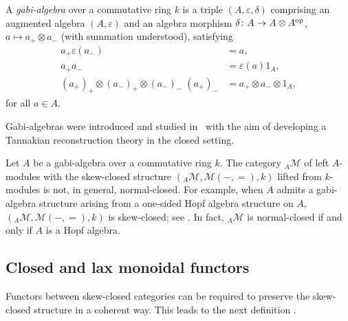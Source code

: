 \documentclass[12pt,dvipsnames,oneside]{amsart}
\theoremstyle{plain}
\theoremstyle{remark}
\theoremstyle{definition}
\newcommand*{\from}{\colon}
\newcommand*{\blank}{{-}}
\newcommand*{\bblank}{{=}}
\newcommand{\op}{^{\textup{op}}}
\newcommand{\cM}{\mathcal{M}}
\begin{document}
\begin{definition}\label{def:gabi-algebra}
  A \emph{gabi-algebra} over a commutative ring \(k\) is a triple \((A, \varepsilon, \delta)\) comprising an augmented algebra \((A, \varepsilon)\) and an algebra morphism \(\delta \from A \to A \otimes A\op\), \(a \mapsto a_{+} \otimes a_{-}\) (with summation understood), satisfying
  \begin{align}
    a_+ \varepsilon(a_{-}) &= a  \tag{GA1}\label{eq:GA1},\\
    a_{+}a_{-} & = \varepsilon(a) 1_{A} \tag{GA2}\label{eq:GA2},\\
    (a_{+})_{+} \otimes (a_{-})_{+} \otimes (a_{-})_{-} \; (a_{+})_{-} &= a_{+} \otimes a_{-} \otimes 1_{A}, \tag{GA3}\label{eq:GA3}
  \end{align}
  for all \(a \in A\).
\end{definition}

Gabi-algebras were introduced and studied in~\cite{Berger-Vercruysse-Saracco} with the aim of developing a Tannakian reconstruction theory in the closed setting.

\begin{example}\label{ex:gabi-algebra}
  Let \(A\) be a gabi-algebra over a commutative ring \(k\).
  The category \({}_A\cM\) of left \(A\)-modules with the skew-closed structure  \(\left({}_A\cM,\cM(\blank,\bblank),k\right)\) lifted from \(k\)-modules is not, in general, normal-closed.
  For example, when \(A\) admits a gabi-algebra structure arising from a one-sided Hopf algebra structure on \(A\), \(\left({}_A\cM, \cM(\blank,\bblank), k\right)\) is skew-closed; see \cite[\S4.5]{Berger-Vercruysse-Saracco}. In fact, \({}_A\cM\) is normal-closed if and only if \(A\) is a Hopf algebra.
\end{example}

\subsection{Closed and lax monoidal functors}\label{sec:closed-functors}

Functors between skew-closed categories can be required to preserve the skew-closed structure in a coherent way.
This leads to the next definition \cite[\S3]{Eilenberg-Kelly}.
\end{document}
